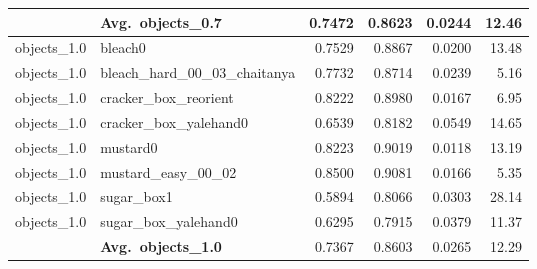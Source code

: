 \begin{longtable}{llrrrr}
  \cmidrule{2-6}
  & \textbf{Avg.~objects_0.7} & 0.7472 & 0.8623 & 0.0244 & 12.46 \\
  \midrule
  objects_1.0 & bleach0 & 0.7529 & 0.8867 & 0.0200 & 13.48 \\
  objects_1.0 & bleach\_hard\_00\_03\_chaitanya & 0.7732 & 0.8714 & 0.0239 & 5.16 \\
  objects_1.0 & cracker\_box\_reorient & 0.8222 & 0.8980 & 0.0167 & 6.95 \\
  objects_1.0 & cracker\_box\_yalehand0 & 0.6539 & 0.8182 & 0.0549 & 14.65 \\
  objects_1.0 & mustard0 & 0.8223 & 0.9019 & 0.0118 & 13.19 \\
  objects_1.0 & mustard\_easy\_00\_02 & 0.8500 & 0.9081 & 0.0166 & 5.35 \\
  objects_1.0 & sugar\_box1 & 0.5894 & 0.8066 & 0.0303 & 28.14 \\
  objects_1.0 & sugar\_box\_yalehand0 & 0.6295 & 0.7915 & 0.0379 & 11.37 \\
  \cmidrule{2-6}
  & \textbf{Avg.~objects_1.0} & 0.7367 & 0.8603 & 0.0265 & 12.29 \\
  \midrule
\bottomrule
\end{longtable}